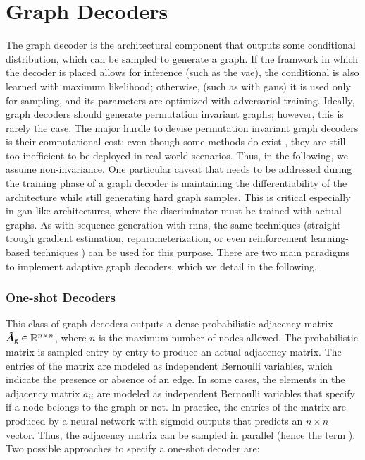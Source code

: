 \section{Graph Decoders}
The graph decoder is the architectural component that outputs some conditional distribution, which can be sampled to generate a graph. If the framwork in which the decoder is placed allows for inference (such as the \gls{vae}), the conditional is also learned with maximum likelihood; otherwise, (such as with \glspl{gan}) it is used only for sampling, and its parameters are optimized with adversarial training. Ideally, graph decoders should generate permutation invariant graphs; however, this is rarely the case. The major hurdle to devise permutation invariant graph decoders is their computational cost; even though some methods do exist \citep{ermon2020permutationinvariantgraphgeneration}, they are still too inefficient to be deployed in real world scenarios. Thus, in the following, we assume non-invariance.
One particular caveat that needs to be addressed during the training phase of a graph decoder is maintaining the differentiability of the architecture while still generating hard graph samples. This is critical especially in \gls{gan}-like architectures, where the discriminator must be trained with actual graphs. As with sequence generation with \glspl{rnn}, the same techniques (straight-trough gradient estimation, reparameterization, or even reinforcement learning-based techniques \cite{williams1992reinforce}) can be used for this purpose. There are two main paradigms to implement adaptive graph decoders, which we detail in the following.

\subsubsection*{One-shot Decoders}
This class of graph decoders outputs a dense probabilistic adjacency matrix $\ProbAdjMatrix{g} \in \Real^{n \times n}$, where $n$ is the maximum number of nodes allowed. The probabilistic matrix is sampled entry by entry to produce an actual adjacency matrix. The entries of the matrix are modeled as independent Bernoulli variables, which indicate the presence or absence of an edge. In some cases, the elements in the adjacency matrix $a_{ii}$ are modeled as independent Bernoulli variables that specify if a node belongs to the graph or not. In practice, the entries of the matrix are produced by a neural network with sigmoid outputs that predicts an $n \times n$ vector. Thus, the adjacency matrix can be sampled in parallel (hence the term ). Two possible approaches to specify a one-shot decoder are:

